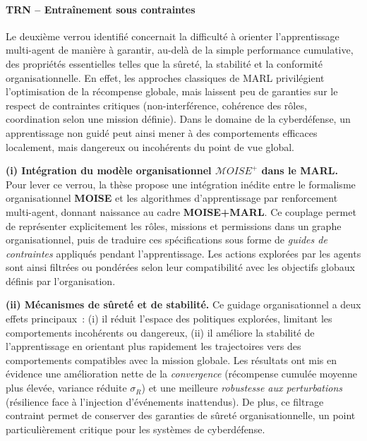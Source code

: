 \paragraph{TRN – Entraînement sous contraintes}

Le deuxième verrou identifié concernait la difficulté à orienter l’apprentissage multi-agent de manière à garantir, au-delà de la simple performance cumulative, des propriétés essentielles telles que la sûreté, la stabilité et la conformité organisationnelle.
En effet, les approches classiques de \ac{MARL} privilégient l’optimisation de la récompense globale, mais laissent peu de garanties sur le respect de contraintes critiques (non-interférence, cohérence des rôles, coordination selon une mission définie).
Dans le domaine de la cyberdéfense, un apprentissage non guidé peut ainsi mener à des comportements efficaces localement, mais dangereux ou incohérents du point de vue global.

\medskip
\noindent
\textbf{(i) Intégration du modèle organisationnel $\mathcal{M}OISE^+$ dans le MARL.}
Pour lever ce verrou, la thèse propose une intégration inédite entre le formalisme organisationnel \textbf{MOISE} et les algorithmes d’apprentissage par renforcement multi-agent, donnant naissance au cadre \textbf{MOISE+MARL}.
Ce couplage permet de représenter explicitement les rôles, missions et permissions dans un graphe organisationnel, puis de traduire ces spécifications sous forme de \textit{guides de contraintes} appliqués pendant l’apprentissage.
Les actions explorées par les agents sont ainsi filtrées ou pondérées selon leur compatibilité avec les objectifs globaux définis par l’organisation.

\medskip
\noindent
\textbf{(ii) Mécanismes de sûreté et de stabilité.}
Ce guidage organisationnel a deux effets principaux~:
(i) il réduit l’espace des politiques explorées, limitant les comportements incohérents ou dangereux,
(ii) il améliore la stabilité de l’apprentissage en orientant plus rapidement les trajectoires vers des comportements compatibles avec la mission globale.
Les résultats ont mis en évidence une amélioration nette de la \textit{convergence} (récompense cumulée moyenne plus élevée, variance réduite $\sigma_R$) et une meilleure \textit{robustesse aux perturbations} (résilience face à l’injection d’événements inattendus).
De plus, ce filtrage contraint permet de conserver des garanties de sûreté organisationnelle, un point particulièrement critique pour les systèmes de cyberdéfense.

